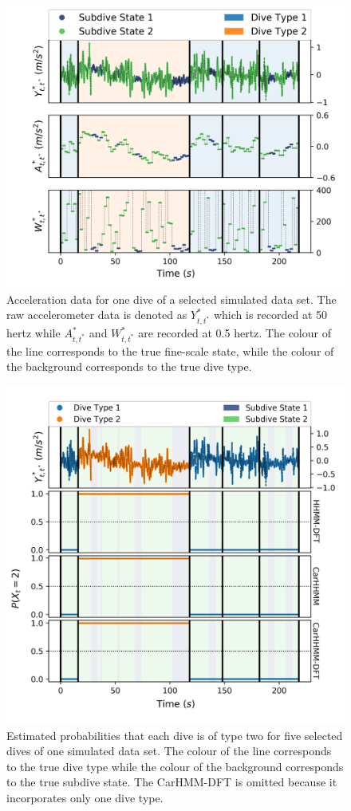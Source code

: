 \begin{figure}[ht]
	\centering
	\includegraphics[width=5in]{../Plots/sim_data.png}
	\caption{Acceleration data for one dive of a selected simulated data set. The raw accelerometer data is denoted as $Y^*_{t,t^*}$ which is recorded at 50 hertz while $A^*_{t,t^*}$ and $W^*_{t,t^*}$ are recorded at 0.5 hertz. The colour of the line corresponds to the true fine-scale state, while the colour of the background corresponds to the true dive type.}
	\label{fig:sim_data}
\end{figure}

\begin{figure}[ht]
    \centering
    \includegraphics[width=4.5in]{../Plots/Posterior_Coarse_States.png}
    \caption{Estimated probabilities that each dive is of type two for five selected dives of one simulated data set. The colour of the line corresponds to the true dive type while the colour of the background corresponds to the true subdive state. The CarHMM-DFT is omitted because it incorporates only one dive type.}
    \label{fig:acc_coarse}
\end{figure}

